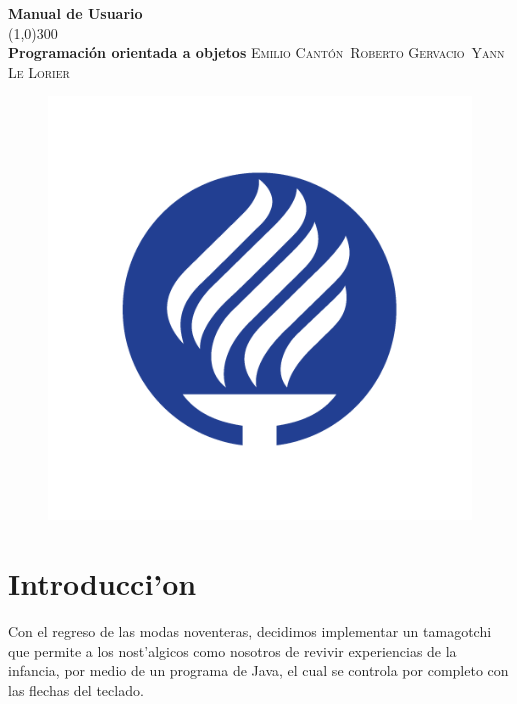 \documentclass[12pt]{amsart}
\begin{document}
\begin{titlepage}
	\begin{center}	
	\huge{\bfseries{Manual de Usuario}}\\
	[0.1cm]
	\line(1,0){300}\\
	\huge{\bfseries{Programaci\'on orientada a objetos}}
	\textsc{\small{Emilio Cant\'on}}\
	\textsc{\small{Roberto Gervacio}}\
	\textsc{\small{Yann Le Lorier}}
	\begin{figure}
		\includegraphics[width=\linewidth]{images/Tec.jpg}
	\end{figure}
	
	\end{center}

\end{titlepage}

\tableofcontents

\section{Introducci'on}
\hspace{10mm}Con el regreso de las modas noventeras, decidimos implementar un tamagotchi que permite a los nost'algicos como nosotros de revivir experiencias de la infancia, por medio de un programa de Java, el cual se controla por completo con las flechas del teclado.
\end{document}
